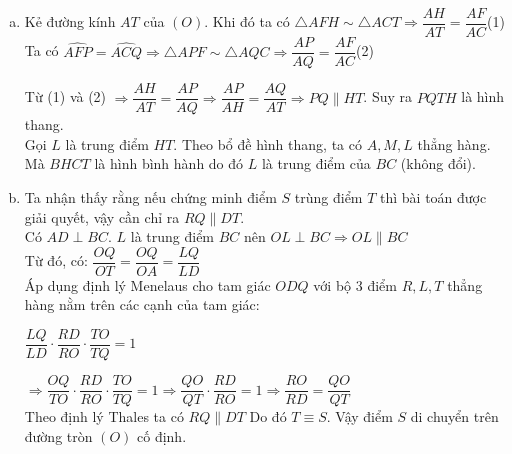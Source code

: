 \documentclass[12pt,a4paper]{article}
\begin{document}
\begin{enumerate}[a)]
\item Kẻ đường kính $AT$ của $(O)$. Khi đó ta có $\triangle{AFH}\sim\triangle{ACT}\Rightarrow\dfrac{AH}{AT}=\dfrac{AF}{AC}$\qquad(1)\\

Ta có $\widehat{AFP}=\widehat{ACQ}\Rightarrow\triangle{APF}\sim\triangle{AQC}\Rightarrow\dfrac{AP}{AQ}=\dfrac{AF}{AC}$\qquad(2)
	
Từ (1) và (2) $\Rightarrow\dfrac{AH}{AT}=\dfrac{AP}{AQ}\Rightarrow\dfrac{AP}{AH}=\dfrac{AQ}{AT}\Rightarrow{PQ}\parallel{HT}$. Suy ra $PQTH$ là hình thang.\\

Gọi $L$ là trung điểm $HT$. Theo bổ đề hình thang, ta có $A,M,L$ thẳng hàng. Mà $BHCT$ là hình bình hành do đó $L$ là trung điểm của $BC$ (không đổi).\\


\item Ta nhận thấy rằng nếu chứng minh điểm $S$ trùng điểm $T$ thì bài toán được giải quyết, vậy cần chỉ ra $RQ\parallel{DT}$.\\

Có $AD\perp{BC}$. $L$ là trung điểm $BC$ nên $OL\perp{BC}\Rightarrow{OL}\parallel{BC}$\\

Từ đó, có: $\dfrac{OQ}{OT}=\dfrac{OQ}{OA}=\dfrac{LQ}{LD}$\\

Áp dụng định lý Menelaus cho tam giác $ODQ$ với bộ 3 điểm $R,L,T$ thẳng hàng nằm trên các cạnh của tam giác:
\begin{center}
	$\dfrac{LQ}{LD}\cdot\dfrac{RD}{RO}\cdot\dfrac{TO}{TQ}=1$
\end{center}
$\Rightarrow\dfrac{OQ}{TO}\cdot\dfrac{RD}{RO}\cdot\dfrac{TO}{TQ}=1\Rightarrow\dfrac{QO}{QT}\cdot\dfrac{RD}{RO}=1\Rightarrow\dfrac{RO}{RD}=\dfrac{QO}{QT}$\\

Theo định lý Thales ta có $RQ\parallel{DT}$ Do đó $T\equiv{S}$. Vậy điểm $S$ di chuyển trên đường tròn $(O)$ cố định.


\end{enumerate}
\end{document}
